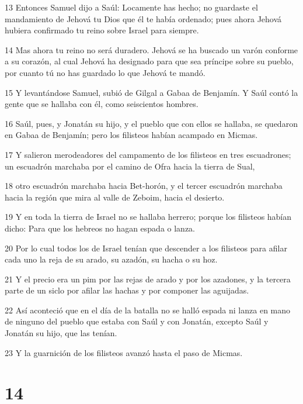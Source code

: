 \par 13 Entonces Samuel dijo a Saúl: Locamente has hecho; no guardaste el mandamiento de Jehová tu Dios que él te había ordenado; pues ahora Jehová hubiera confirmado tu reino sobre Israel para siempre.
\par 14 Mas ahora tu reino no será duradero. Jehová se ha buscado un varón conforme a su corazón, al cual Jehová ha designado para que sea príncipe sobre su pueblo, por cuanto tú no has guardado lo que Jehová te mandó.
\par 15 Y levantándose Samuel, subió de Gilgal a Gabaa de Benjamín. Y Saúl contó la gente que se hallaba con él, como seiscientos hombres.
\par 16 Saúl, pues, y Jonatán su hijo, y el pueblo que con ellos se hallaba, se quedaron en Gabaa de Benjamín; pero los filisteos habían acampado en Micmas.
\par 17 Y salieron merodeadores del campamento de los filisteos en tres escuadrones; un escuadrón marchaba por el camino de Ofra hacia la tierra de Sual,
\par 18 otro escuadrón marchaba hacia Bet-horón, y el tercer escuadrón marchaba hacia la región que mira al valle de Zeboim, hacia el desierto.
\par 19 Y en toda la tierra de Israel no se hallaba herrero; porque los filisteos habían dicho: Para que los hebreos no hagan espada o lanza.
\par 20 Por lo cual todos los de Israel tenían que descender a los filisteos para afilar cada uno la reja de su arado, su azadón, su hacha o su hoz.
\par 21 Y el precio era un pim por las rejas de arado y por los azadones, y la tercera parte de un siclo   por afilar las hachas y por componer las aguijadas.
\par 22 Así aconteció que en el día de la batalla no se halló espada ni lanza en mano de ninguno del pueblo que estaba con Saúl y con Jonatán, excepto Saúl y Jonatán su hijo, que las tenían.
\par 23 Y la guarnición de los filisteos avanzó hasta el paso de Micmas.

\chapter{14}

